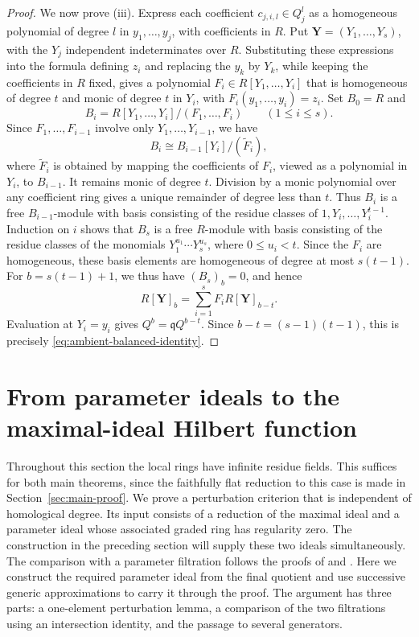 \documentclass[11pt,reqno]{amsart}
\numberwithin{equation}{section}
\theoremstyle{definition}
\begin{document}
\begin{proof}
We now prove (iii). Express each coefficient $c_{j,i,l}\in Q_j^l$
as a homogeneous polynomial of degree $l$ in $y_1,\ldots,y_j$, with
coefficients in $R$. Put $\mathbf Y=(Y_1,\ldots,Y_s)$, with the $Y_j$
independent indeterminates over $R$. Substituting these expressions
into the formula defining $z_i$ and replacing the $y_k$ by $Y_k$,
while keeping the coefficients in $R$ fixed, gives a polynomial
$F_i\in R[Y_1,\ldots,Y_i]$ that is homogeneous of degree $t$
and monic of degree $t$ in $Y_i$, with $F_i(y_1,\ldots,y_i)=z_i$.
Set $B_0=R$ and
\[
 B_i=R[Y_1,\ldots,Y_i]/(F_1,\ldots,F_i)
 \qquad(1\le i\le s).
\]
Since $F_1,\ldots,F_{i-1}$ involve only $Y_1,\ldots,Y_{i-1}$, we have
\[
 B_i\cong B_{i-1}[Y_i]/(\widetilde F_i),
\]
where $\widetilde F_i$ is obtained by mapping the coefficients of $F_i$,
viewed as a polynomial in $Y_i$, to $B_{i-1}$.
It remains monic of degree $t$. Division by a monic polynomial over
any coefficient ring gives a unique remainder of degree less than $t$.
Thus $B_i$ is a free $B_{i-1}$-module with basis consisting of the
residue classes of $1,Y_i,\ldots,Y_i^{t-1}$.
Induction on $i$ shows that $B_s$ is a free $R$-module with basis
consisting of the residue classes of the monomials
$Y_1^{u_1}\cdots Y_s^{u_s}$, where $0\le u_i<t$.
Since the $F_i$ are homogeneous, these basis elements are homogeneous
of degree at most $s(t-1)$. For $b=s(t-1)+1$, we thus have
$(B_s)_b=0$, and hence
\[
 R[\mathbf Y]_b=\sum_{i=1}^s F_iR[\mathbf Y]_{b-t}.
\]
Evaluation at $Y_i=y_i$ gives $Q^b=\mathfrak qQ^{b-t}$.
Since $b-t=(s-1)(t-1)$, this is precisely
\eqref{eq:ambient-balanced-identity}.
\end{proof}

\section{From parameter ideals to the maximal-ideal Hilbert function}
\label{sec:transport}

Throughout this section the local rings have infinite residue fields.
This suffices for both main theorems, since the faithfully flat
reduction to this case is made in Section~\ref{sec:main-proof}.
We prove a perturbation criterion that is independent of homological
degree. Its input consists of a reduction of the maximal ideal and a parameter
ideal whose associated graded ring has regularity zero. The construction in
the preceding section will supply these two ideals simultaneously.
The comparison with a parameter filtration follows the proofs of
\cite[Proposition~1]{ST97} and \cite[Theorem~4.2]{QVT}.
Here we construct the required parameter ideal from the final quotient
and use successive generic approximations to carry it through the proof.
The argument has three parts: a one-element perturbation lemma,
a comparison of the two filtrations using an intersection identity,
and the passage to several generators.
\end{document}
